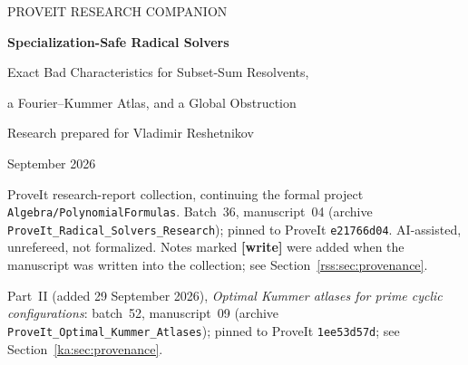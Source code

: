 \documentclass[11pt,a4paper]{article}
\theoremstyle{definition}
\theoremstyle{remark}
\newcommand{\code}[1]{{\small\nolinkurl{#1}}}
\begin{document}
\begin{center}
{\small\sffamily\color{accent} PROVEIT RESEARCH COMPANION\par}
\vspace{0.45cm}
{\LARGE\bfseries\color{ink} Specialization-Safe Radical Solvers\par}
\vspace{0.25cm}
{\large Exact Bad Characteristics for Subset-Sum Resolvents,\par
 a Fourier--Kummer Atlas, and a Global Obstruction\par}
\vspace{0.5cm}
{Research prepared for Vladimir Reshetnikov\par}
{September 2026\par}
\vspace{0.3cm}
{\footnotesize ProveIt research-report collection, continuing the formal
project \code{Algebra/PolynomialFormulas}. Batch~36, manuscript~04
(archive \code{ProveIt_Radical_Solvers_Research}); pinned to ProveIt
\code{e21766d04}. AI-assisted, unrefereed, not formalized.
Notes marked \textbf{[write]} were added when the manuscript was written into
the collection; see Section~\ref{rss:sec:provenance}.\par
\smallskip
Part~II (added 29 September 2026), \emph{Optimal Kummer atlases for prime
cyclic configurations}: batch~52, manuscript~09 (archive
\code{ProveIt_Optimal_Kummer_Atlases}); pinned to ProveIt \code{1ee53d57d};
see Section~\ref{ka:sec:provenance}.\par}
\end{center}
\end{document}
